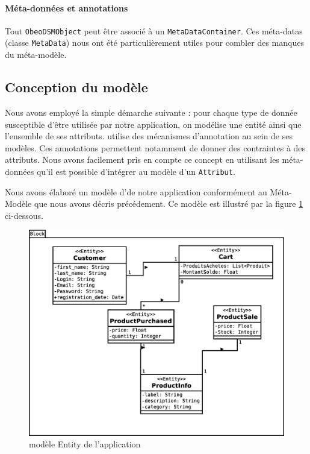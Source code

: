 \paragraph{Méta-données et annotations}
Tout \verb+ObeoDSMObject+ peut être associé à un \verb+MetaDataContainer+. Ces méta-datas (classe \verb+MetaData+) nous ont été particulièrement utiles pour combler des manques du méta-modèle.


\subsection{Conception du modèle}

Nous avons employé la simple démarche suivante : pour chaque type de donnée susceptible d'être utilisée par notre application, on modélise une entité ainsi que l'ensemble de ses attributs. \kwplay{} utilise des mécanismes d'annotation au sein de ses modèles. Ces annotations permettent notamment de donner des contraintes à des attributs. Nous avons facilement pris en compte ce concept en utilisant les méta-données qu'il est possible d'intégrer au modèle d'un \verb+Attribut+.

Nous avons élaboré un modèle d'\kwentity de notre application conformément au Méta-Modèle que nous avons décris précédement. Ce modèle est illustré par la figure \ref{fig:entMod} ci-dessous.

\begin{figure}[h]
  \centering
  \includegraphics[scale=.4]{img/Entitymodel.eps}
  \caption{modèle Entity de l'application}
  \label{fig:entMod}
\end{figure}

